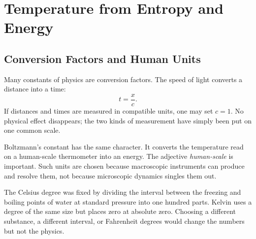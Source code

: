 \chapter{Temperature from Entropy and Energy}


\section{Conversion Factors and Human Units}

Many constants of physics are conversion factors. The speed of light converts
a distance into a time:
\begin{equation}
 t=\frac{x}{c}.
\end{equation}
If distances and times are measured in compatible units, one may set \(c=1\).
No physical effect disappears; the two kinds of measurement have simply been
put on one common scale.

Boltzmann's constant has the same character. It converts the temperature read
on a human-scale thermometer into an energy. The adjective
\emph{human-scale} is important. Such units are chosen because macroscopic
instruments can produce and resolve them, not because microscopic dynamics
singles them out.

The Celsius degree was fixed by dividing the interval between the freezing and
boiling points of water at standard pressure into one hundred parts. Kelvin
uses a degree of the same size but places zero at absolute zero. Choosing a
different substance, a different interval, or Fahrenheit degrees would change
the numbers but not the physics.

\begin{classroomqa}
\end{classroomqa}

